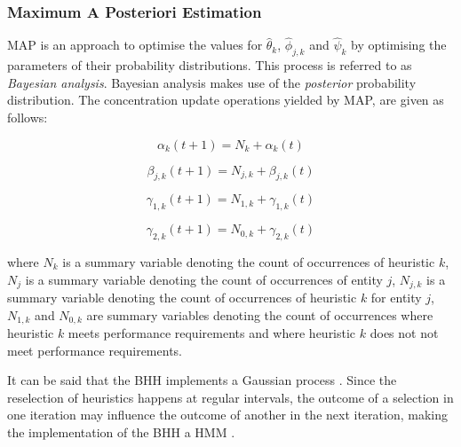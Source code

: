 \documentclass[preprint,review,12pt]{elsarticle}
\begin{document}
\subsubsection{Maximum A Posteriori Estimation}\label{sec:bhh:optimisation_step:map}

\Acs{MAP} is an approach to optimise the values for $\hat{\theta}_{k}$, $\hat{\phi}_{j,k}$ and $\hat{\psi}_{k}$ by optimising the parameters of their probability distributions. This process is referred to as \textit{Bayesian analysis}. Bayesian analysis makes use of the \textit{posterior} probability distribution. The concentration update operations yielded by \acs{MAP}, are given as follows:


\begin{equation}
	\label{eq:bhh:optimisation_step:map:alpha_update_operation}
	\alpha_{k}(t+1) = N_{k} + \alpha_{k}(t)
\end{equation}

\begin{equation}
	\label{eq:bhh:optimisation_step:map:beta_update_operation}
	\beta_{j,k}(t+1) = N_{j,k} + \beta_{j,k}(t)
\end{equation}

\begin{equation}
	\label{eq:bhh:optimisation_step:map:gamma1_update_operation}
	\gamma_{1,k}(t+1) = N_{1,k} + \gamma_{1,k}(t)
\end{equation}

\begin{equation}
	\label{eq:bhh:optimisation_step:map:gamma2_update_operation}
	\gamma_{2,k}(t+1) = N_{0,k} + \gamma_{2,k}(t)
\end{equation}

\vspace{5mm}


\noindent
where $N_{k}$ is a summary variable denoting the count of occurrences of heuristic $k$, $N_{j}$ is a summary variable denoting the count of occurrences of entity $j$, $N_{j,k}$ is a summary variable denoting the count of occurrences of heuristic $k$ for entity $j$, $N_{1,k}$ and $N_{0,k}$ are summary variables denoting the count of occurrences where heuristic $k$ meets performance requirements and where heuristic $k$ does not not meet performance requirements.

It can be said that the \acs{BHH} implements a Gaussian process \citep{ref:gortler:2019}. Since the reselection of heuristics happens at regular intervals, the outcome of a selection in one iteration may influence the outcome of another in the next iteration, making the implementation of the \acs{BHH} a \acf{HMM} \citep{ref:rabiner:1986}.
\end{document}
